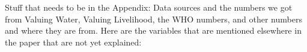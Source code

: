 Stuff that needs to be in the Appendix: 
Data sources and the numbers we got from Valuing Water, Valuing Livelihood, the WHO numbers, and other numbers and where they are from.
Here are the variables that are mentioned elsewhere in the paper that are not yet explained: